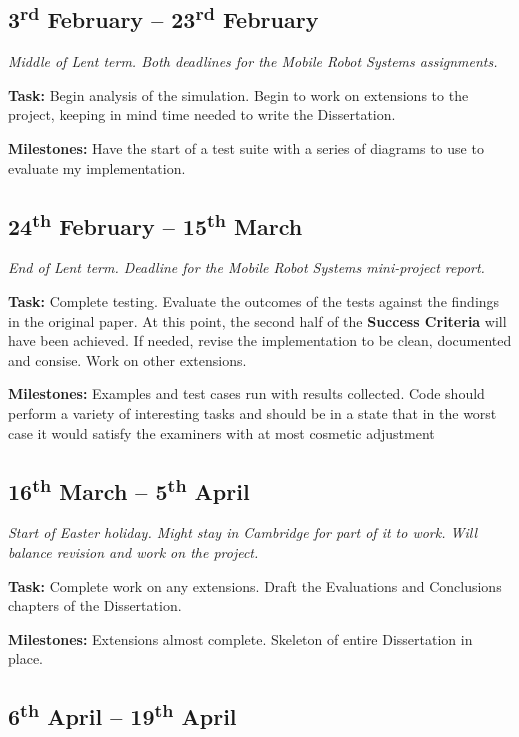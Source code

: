 \documentclass[12pt]{article}
\newcommand{\sups}{\textsuperscript}
\begin{document}
\subsection*{3\sups{rd} February -- 23\sups{rd} February}

\emph{Middle of Lent term. Both deadlines for the Mobile Robot Systems assignments.}

{\bf Task:} Begin analysis of the simulation. Begin to work on extensions to the project, keeping in mind time needed to write the Dissertation.

{\bf Milestones:} Have the start of a test suite with a series of diagrams to use to evaluate my implementation.

\subsection*{24\sups{th} February -- 15\sups{th} March}

\emph{End of Lent term. Deadline for the Mobile Robot Systems mini-project report.}

{\bf Task:} Complete testing. Evaluate the outcomes of the tests against the findings in the original paper. At this point, the second half of the {\bf Success Criteria} will have been achieved. If needed, revise the implementation to be clean, documented and consise. Work on other extensions.

{\bf Milestones:} Examples and test cases run with results collected. Code should perform a variety of interesting tasks and should be in a state that in the worst case it would satisfy the examiners with at most cosmetic adjustment

\subsection*{16\sups{th} March -- 5\sups{th} April}

\emph{Start of Easter holiday. Might stay in Cambridge for part of it to work. Will balance revision and work on the project.}

{\bf Task:} Complete work on any extensions. Draft the Evaluations and Conclusions chapters of the Dissertation.

{\bf Milestones:} Extensions almost complete. Skeleton of entire Dissertation in place.

\subsection*{6\sups{th} April -- 19\sups{th} April}
\end{document}
